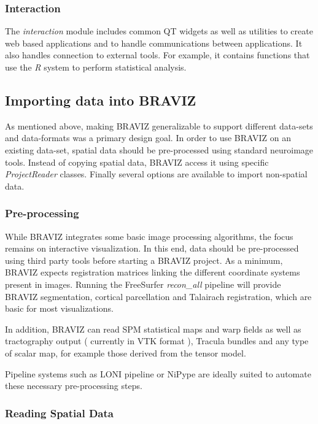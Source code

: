 \documentclass{frontiersHLTH}
\begin{document}
\subsubsection{Interaction}

The \emph{interaction} module includes common QT widgets as well as utilities to create web based applications and to handle communications between applications. It also handles connection to external tools. For example, it contains functions that use the \emph{R} system to perform statistical analysis. 

\subsection{Importing data into BRAVIZ}

As mentioned above, making BRAVIZ generalizable to support different data-sets and data-formats was a primary design goal.
In order to use BRAVIZ on an existing data-set, spatial data should be pre-processed using standard neuroimage tools. Instead of copying spatial data, BRAVIZ access it using specific \emph{ProjectReader} classes. Finally several options are available to import non-spatial data.

\subsubsection{Pre-processing}

While BRAVIZ integrates some basic image processing algorithms, the focus remains on interactive visualization. In this end,  data should be pre-processed using third party tools before starting a BRAVIZ project. As a minimum, BRAVIZ expects registration matrices linking the different coordinate systems present in images. Running the FreeSurfer \emph{recon\_all} pipeline will provide BRAVIZ segmentation, cortical parcellation and Talairach registration, which are basic for most visualizations. 

In addition, BRAVIZ can read SPM statistical maps and warp fields as well as tractography output ( currently in VTK format ), Tracula bundles and any type of scalar map, for example those derived from the tensor model.

Pipeline systems such as LONI pipeline \cite{dinov_efficient_2009} or NiPype \cite{gorgolewski_nipype:_2011} are ideally suited to automate these necessary pre-processing steps.

\subsubsection{Reading Spatial Data}
\end{document}
